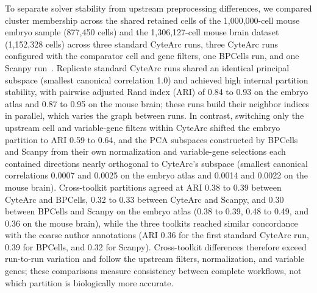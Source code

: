 To separate solver stability from upstream preprocessing differences, we compared cluster membership across the shared retained cells of the 1,000,000-cell mouse embryo sample (877,450 cells) and the 1,306,127-cell mouse brain dataset (1,152,328 cells) across three standard CyteArc runs, three CyteArc runs configured with the comparator cell and gene filters, one BPCells run, and one Scanpy run~\cite{qiu2024,parks2025bpcells,wolf2018}. Replicate standard CyteArc runs shared an identical principal subspace (smallest canonical correlation 1.0) and achieved high internal partition stability, with pairwise adjusted Rand index (ARI) of 0.84 to 0.93 on the embryo atlas and 0.87 to 0.95 on the mouse brain; these runs build their neighbor indices in parallel, which varies the graph between runs. In contrast, switching only the upstream cell and variable-gene filters within CyteArc shifted the embryo partition to ARI 0.59 to 0.64, and the PCA subspaces constructed by BPCells and Scanpy from their own normalization and variable-gene selections each contained directions nearly orthogonal to CyteArc's subspace (smallest canonical correlations 0.0007 and 0.0025 on the embryo atlas and 0.0014 and 0.0022 on the mouse brain). Cross-toolkit partitions agreed at ARI 0.38 to 0.39 between CyteArc and BPCells, 0.32 to 0.33 between CyteArc and Scanpy, and 0.30 between BPCells and Scanpy on the embryo atlas (0.38 to 0.39, 0.48 to 0.49, and 0.36 on the mouse brain), while the three toolkits reached similar concordance with the coarse author annotations (ARI 0.36 for the first standard CyteArc run, 0.39 for BPCells, and 0.32 for Scanpy). Cross-toolkit differences therefore exceed run-to-run variation and follow the upstream filters, normalization, and variable genes; these comparisons measure consistency between complete workflows, not which partition is biologically more accurate.

\label{note:Evaluation against experimental data}

